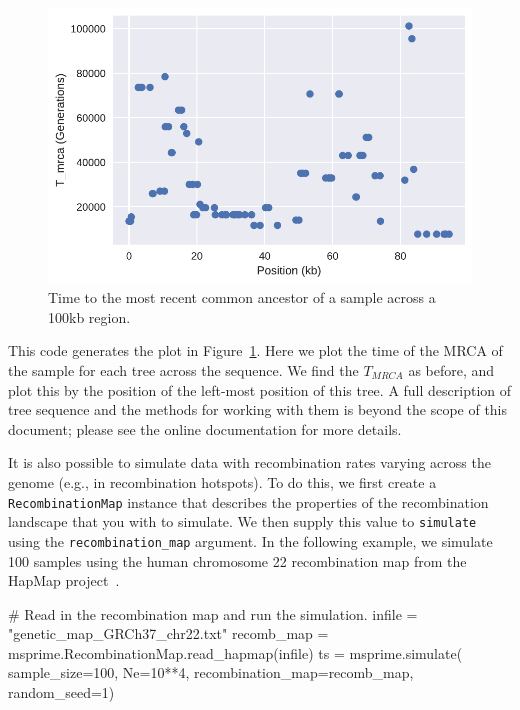\documentclass[graybox]{svmult}
\newcommand{\includenbimage}[1]{\begin{center}\texttt{[image: \#1]}\end{center}}
\begin{document}

\begin{figure}
\begin{center}
\includegraphics[width=\textwidth]{images/simulations_50_0.pdf}
\end{center}
\caption{\label{fig:tree_tmrcas}Time to the most recent common ancestor of
a sample across a 100kb region.}
\end{figure}

This code generates the plot in Figure~\ref{fig:tree_tmrcas}.
Here we plot the time of the MRCA of the sample for each tree across the
sequence. We find the \(T_{MRCA}\) as before, and plot this by the
position of the left-most position of this tree. A full description of
tree sequence and the methods for working with them is beyond the scope
of this document; please see the online documentation for more details.

It is also possible to simulate data with recombination rates varying
across the genome (e.g., in recombination hotspots). To do this, we
first create a \texttt{RecombinationMap} instance that describes the
properties of the recombination landscape that you with to simulate. We
then supply this value to \texttt{simulate} using the
\texttt{recombination\_map} argument. In the following example, we
simulate 100 samples using the human chromosome 22 recombination map
from the HapMap project~\citep{international2003international}.

\begin{pythoncode}
# Read in the recombination map and run the simulation.
infile = "genetic_map_GRCh37_chr22.txt"
recomb_map = msprime.RecombinationMap.read_hapmap(infile)
ts = msprime.simulate(
    sample_size=100,
    Ne=10**4,
    recombination_map=recomb_map,
    random_seed=1)
\end{pythoncode}
\end{document}
